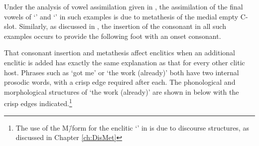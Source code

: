 \begin{exe}
	\label{ex:130825-7, 0.11}
	\label{ex:130825-6, 19.24}
\end{exe}

Under the analysis of vowel assimilation given in ,
the assimilation of the final vowels of  `{\kau}' {\ra} 
and  {\ra}  `{\kai}' in such examples
is due to metathesis of the medial empty C-slot.
Similarly, as discussed in , the insertion of the consonant
in all such examples occurs to provide the following foot with an onset consonant.

That consonant insertion and metathesis affect
enclitics when an additional enclitic is added
has exactly the same explanation as that for every other clitic host.
Phrases such as  `got me'
or  `the work (already)'
both have two internal prosodic words,
with a crisp edge required after each.
The phonological and morphological structures
of  `the work (already)' are shown in 
below with the crisp edges indicated.\footnote{
		The use of the M\=/form for the enclitic  `{\een}' in 
		is due to discourse structures, as discussed in Chapter \ref{ch:DisMet}}

